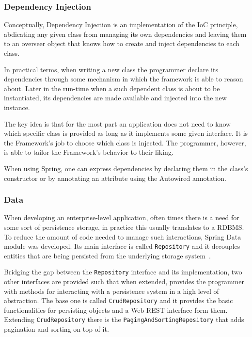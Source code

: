 \subsubsection{Dependency Injection}\label{spring:ds}
Conceptually, Dependency Injection is an implementation of the \gls{IoC} principle, abdicating any given class from managing its own dependencies and leaving them to an overseer object that knows how to create and inject dependencies to each class\cite{inversion}.

In practical terms, when writing a new class the programmer declare its dependencies through some mechanism in which the framework is able to reason about. Later in the run-time when a such dependent class is about to be instantiated, its dependencies are made available and injected into the new instance.

The key idea is that for the most part an application does not need to know which specific class is provided as long as it implements some given interface. It is the Framework's job to choose which class is injected. The programmer, however, is able to tailor the Framework's behavior to their liking.

When using Spring, one can express dependencies by declaring them in the class's constructor or by annotating an attribute using the Autowired annotation\cite{springdi}.

\subsubsection{Data}
When developing an enterprise-level application, often times there is a need for some sort of persistence storage, in practice this usually translates to a \gls{RDBMS}. To reduce the amount of code needed to manage such interactions, Spring Data module was developed. Its main interface is called \texttt{Repository} and it decouples entities that are being persisted from the underlying storage system~\cite{springdata}.

Bridging the gap between the \texttt{Repository} interface and its implementation, two other interfaces are provided such that when extended, provides the programmer with methods for interacting with a persistence system in a high level of abstraction. The base one is called \texttt{CrudRepository} and it provides the basic functionalities for persisting objects and a Web \gls{REST} interface form them. Extending \texttt{CrudRepository} there is the \texttt{PagingAndSortingRepository} that adds pagination and sorting on top of it.

